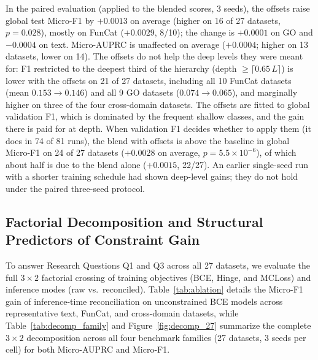 \documentclass[preprint,12pt]{elsarticle}
\begin{document}
In the paired evaluation (applied to the blended scores, 3 seeds), the
offsets raise global test Micro-F1 by $+0.0013$ on average (higher on 16 of
27 datasets, $p = 0.028$), mostly on FunCat ($+0.0029$, 8/10); the change is
$+0.0001$ on GO and $-0.0004$ on text. Micro-AUPRC is unaffected on average
($+0.0004$; higher on 13 datasets, lower on 14). The offsets do not help the
deep levels they were meant for: F1 restricted to the deepest third of the
hierarchy (depth $\ge \lceil 0.65\,L \rceil$) is lower with the offsets on
21 of 27 datasets, including all 10 FunCat datasets (mean $0.153 \to 0.146$)
and all 9 GO datasets ($0.074 \to 0.065$), and marginally higher on three of
the four cross-domain datasets. The offsets are fitted to global
validation F1, which is dominated by the frequent shallow classes, and the
gain there is paid for at depth. When validation F1 decides whether to apply
them (it does in 74 of 81 runs), the blend with offsets is above the
baseline in global Micro-F1 on 24 of 27 datasets ($+0.0028$ on average,
$p = 5.5 \times 10^{-6}$), of which about half is due to the blend alone
($+0.0015$, 22/27). An earlier single-seed run with a shorter training
schedule had shown deep-level gains; they do not hold under the paired
three-seed protocol.

\subsection{Factorial Decomposition and Structural Predictors of Constraint Gain}
\label{sec:ablation}

To answer Research Questions Q1 and Q3 across all 27 datasets, we evaluate the
full $3 \times 2$ factorial crossing of training objectives (BCE, Hinge, and
MCLoss) and inference modes (raw vs.\ reconciled). Table~\ref{tab:ablation}
details the Micro-F1 gain of inference-time reconciliation on unconstrained BCE
models across representative text, FunCat, and cross-domain datasets, while
Table~\ref{tab:decomp_family} and Figure~\ref{fig:decomp_27} summarize the
complete $3 \times 2$ decomposition across all four benchmark families (27
datasets, 3 seeds per cell) for both Micro-AUPRC and Micro-F1.
\end{document}
